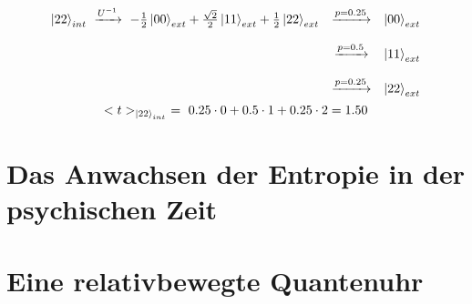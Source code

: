 \documentclass[12pt]{article}
\begin{document}
\begin{equation}
\begin{matrix}
\ket{22}_{int} \ \xrightarrow{U^{-1}} \ -\frac{1}{2}\ket{00}_{ext} + \frac{\sqrt{2}}{2}\ket{11}_{ext} + \frac{1}{2}\ket{22}_{ext} 
& \xrightarrow{p = 0.25} & \ket{00}_{ext} \\ \\
& \xrightarrow{p = 0.5} & \ket{11}_{ext} \\ \\
& \xrightarrow{p = 0.25} & \ket{22}_{ext}
\end{matrix}
\end{equation}
\begin{equation}
<t>_{\ket{22}_{int}} \ = \  0.25 \cdot 0 + 0.5 \cdot 1 + 0.25 \cdot 2 = 1.50
\end{equation}

\section{Das Anwachsen der Entropie in der psychischen Zeit}


\section{Eine relativbewegte Quantenuhr}
\end{document}
